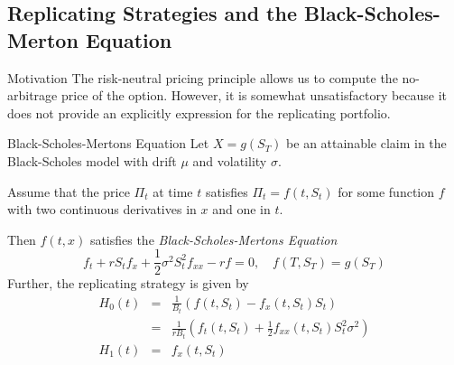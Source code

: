 \documentclass[11pt,a4paper]{article}
\begin{document}
\subsection{Replicating Strategies and the Black-Scholes-Merton Equation}

  \begin{remark}{Motivation}
    The risk-neutral pricing principle allows us to compute the no-arbitrage price of the option. However, it is somewhat unsatisfactory because it does not provide an explicitly expression for the replicating portfolio.
  \end{remark}

  \begin{theorem}{Black-Scholes-Mertons Equation}\label{eqn_black_scholes_mertons}
    Let $X=g(S_T)$ be an attainable claim in the Black-Scholes model with drift $\mu$ and volatility $\sigma$.
    \par Assume that the price $\Pi_t$ at time $t$ satisfies $\Pi_t=f(t,S_t)$ for some function $f$ with two continuous derivatives in $x$ and one in $t$.
    \par Then $f(t,x)$ satisfies the \textit{Black-Scholes-Mertons Equation}
    \[ f_t+rS_tf_x+\frac12\sigma^2S_t^2f_{xx}-rf=0,\quad f(T,S_T)=g(S_T) \]
    Further, the replicating strategy is given by
    \[\begin{array}{rcl}
      H_0(t)&=&\frac1{B_t}\left(f(t,S_t)-f_x(t,S_t)S_t\right)\\
      &=&\frac{1}{rB_t}\left(f_t(t,S_t)+\frac12f_{xx}(t,S_t)S_t^2\sigma^2\right)\\
      H_1(t)&=&f_x(t,S_t)
    \end{array}\]
  \end{theorem}
\end{document}
